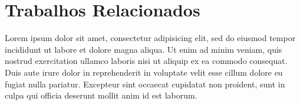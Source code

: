\section{Trabalhos Relacionados}


Lorem ipsum dolor sit amet, consectetur adipisicing elit, sed do eiusmod
tempor incididunt ut labore et dolore magna aliqua. Ut enim ad minim veniam,
quis nostrud exercitation ullamco laboris nisi ut aliquip ex ea commodo
consequat. Duis aute irure dolor in reprehenderit in voluptate velit esse
cillum dolore eu fugiat nulla pariatur. Excepteur sint occaecat cupidatat non
proident, sunt in culpa qui officia deserunt mollit anim id est laborum.